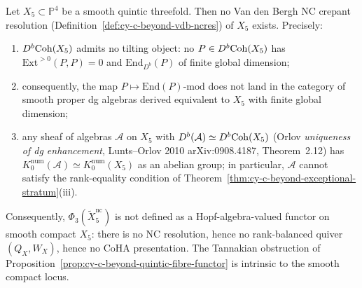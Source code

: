 \begin{theorem}
\label{thm:cy-c-beyond-nc-resolution-dichotomy}
Let $X_5 \subset \mathbb P^4$ be a smooth quintic threefold. Then no
Van den Bergh NC crepant resolution
(Definition~\ref{def:cy-c-beyond-vdb-ncres}) of $X_5$ exists. Precisely:
\begin{enumerate}[label=\textup{(\roman*)}]
 \item $D^b\mathrm{Coh}(X_5)$ admits no tilting object: no
 $P \in D^b\mathrm{Coh}(X_5)$ has $\mathrm{Ext}^{>0}(P, P) = 0$ and
 $\mathrm{End}_{D^b}(P)$ of finite global dimension;
 \item consequently, the map $P \mapsto \mathrm{End}(P)$-$\mathrm{mod}$
 does not land in the category of smooth proper dg algebras
 derived equivalent to $X_5$ with finite global dimension;
 \item any sheaf of algebras $\mathcal A$ on $X_5$ with
 $D^b(\mathcal A) \simeq D^b\mathrm{Coh}(X_5)$ (Orlov
 \emph{uniqueness of dg enhancement}, Lunts--Orlov 2010
 arXiv:0908.4187, Theorem~2.12) has
 $K_0^{\mathrm{num}}(\mathcal A) \simeq K_0^{\mathrm{num}}(X_5)$
 as an abelian group; in particular, $\mathcal A$ cannot
 satisfy the rank-equality condition of
 Theorem~\ref{thm:cy-c-beyond-exceptional-stratum}(iii).
\end{enumerate}
Consequently, $\Phi_3(\widetilde X_5^{\mathrm{nc}})$ is not defined as
a Hopf-algebra-valued functor on smooth compact $X_5$: there is no
NC resolution, hence no rank-balanced quiver
$(Q_X, W_X)$, hence no CoHA presentation. The Tannakian obstruction of
Proposition~\ref{prop:cy-c-beyond-quintic-fibre-functor} is intrinsic
to the smooth compact locus.
\end{theorem}

